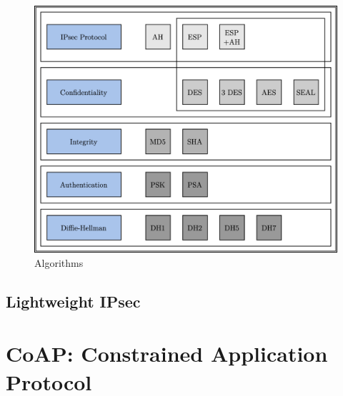 \documentclass[11pt]{book}
\begin{document}
\begin{figure}[H]
	\centering
	\includegraphics [scale=0.175] {summary.png}
	\caption{Algorithms}
\end{figure}
\section{Lightweight IPsec}
\chapter{CoAP: Constrained Application Protocol}
\end{document}
